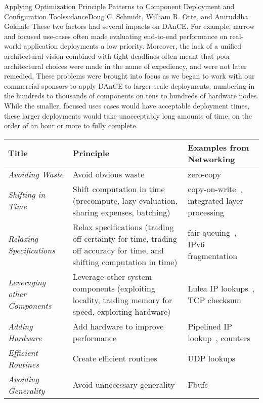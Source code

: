 \begin{aosachapter}{Applying Optimization Principle Patterns to Component Deployment and
                    Configuration Tools}{s:dance}{Doug C. Schmidt, William R. Otte, and Aniruddha Gokhale}
These two factors had several impacts on DAnCE. For example, narrow and
focused use-cases often made evaluating end-to-end performance on
real-world application deployments a low priority. Moreover, the lack of
a unified architectural vision combined with tight deadlines often meant
that poor architectural choices were made in the name of expediency, and
were not later remedied. These problems were brought into focus as we
began to work with our commercial sponsors to apply DAnCE to
larger-scale deployments, numbering in the hundreds to thousands of
components on tens to hundreds of hardware nodes. While the smaller,
focused uses cases would have acceptable deployment times, these larger
deployments would take unacceptably long amounts of time, on the order
of an hour or more to fully complete.

\begin{table}
\centering
{\footnotesize
{}
\begin{tabular}{ p{3.5cm} p{5.0cm} p{4.0cm} }
\hline
Title
& Principle
& Examples from Networking
\\
\hline
\textit{Avoiding Waste}
& Avoid obvious waste
& zero-copy~\cite{Pai:00}
\\ 
\textit{Shifting in Time}
& Shift computation in time (precompute, lazy evaluation, sharing expenses, batching)
& copy-on-write~\cite{Rashid:86a,Ousterhout:88d}, \newline
integrated layer processing~\cite{Clark:90}
\\ 
\textit{Relaxing Specifications}
& Relax specifications (trading off certainty for time, trading off accuracy for time, and shifting computation in time)
& fair queuing~\cite{Varghese:05}, \newline
IPv6 fragmentation
\\ 
\textit{Leveraging other Components}
& Leverage other system components (exploiting locality, trading memory for speed, exploiting hardware)
& Lulea IP lookups~\cite{Degermark:97}, \newline
TCP checksum \\ 
\textit{Adding Hardware}
& Add hardware to improve performance
& Pipelined IP lookup~\cite{Hasan:05}, \newline
counters
\\ 
\textit{Efficient Routines}
& Create efficient routines
& UDP lookups
\\ 
\textit{Avoiding Generality}
& Avoid unnecessary generality
& Fbufs~\cite{Druschel:93}
\\ 

\end{tabular}}
\end{table}
\end{aosachapter}
